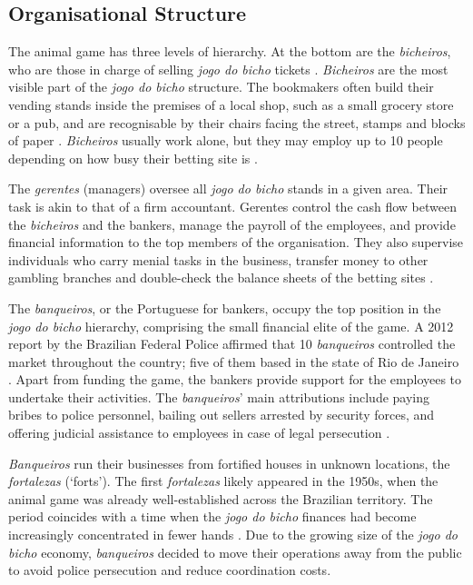\documentclass[a4paper,12pt]{article}
\begin{document}
\subsection{Organisational Structure}
\label{sub:organisation}

The animal game has three levels of hierarchy. At the bottom are the \emph{bicheiros}, who are those in charge of selling \emph{jogo do bicho} tickets \citep{chazkel2007beyond, chazkel2011laws, da1999aguias, labronici2014sorteio, magalhaes2005ganhou, misse2007illegal}. \emph{Bicheiros} are the most visible part of the \emph{jogo do bicho} structure. The bookmakers often build their vending stands inside the premises of a local shop, such as a small grocery store or a pub, and are recognisable by their chairs facing the street, stamps and blocks of paper \citep[259]{chazkel2011laws}. \emph{Bicheiros} usually work alone, but they may employ up to 10 people depending on how busy their betting site is \citep[69]{labronici2014sorteio}.

The \emph{gerentes} (managers) oversee all \emph{jogo do bicho} stands in a given area. Their task is akin to that of a firm accountant. Gerentes control the cash flow between the \emph{bicheiros} and the bankers, manage the payroll of the employees, and provide financial information to the top members of the organisation. They also supervise individuals who carry menial tasks in the business, transfer money to other gambling branches and double-check the balance sheets of the betting sites \citetext{\citealp[71]{labronici2012paratodos}; \citealp[142]{misse2007illegal}}.

The \emph{banqueiros}, or the Portuguese for bankers, occupy the top position in the \emph{jogo do bicho} hierarchy, comprising the small financial elite of the game. A 2012 report by the Brazilian Federal Police affirmed that 10 \emph{banqueiros} controlled the market throughout the country; five of them based in the state of Rio de Janeiro \citep{globo2012contraventores}. Apart from funding the game, the bankers provide support for the employees to undertake their activities. The \emph{banqueiros}' main attributions include paying bribes to police personnel, bailing out sellers arrested by security forces, and offering judicial assistance to employees in case of legal persecution \citep[75]{labronici2012paratodos}.

\emph{Banqueiros} run their businesses from fortified houses in unknown locations, the \emph{fortalezas} (`forts'). The first \emph{fortalezas} likely appeared in the 1950s, when the animal game was already well-established across the Brazilian territory. The period coincides with a time when the \emph{jogo do bicho} finances had become increasingly concentrated in fewer hands \citep[259]{chazkel2011laws}. Due to the growing size of the \emph{jogo do bicho} economy, \emph{banqueiros} decided to move their operations away from the public to avoid police persecution and reduce coordination costs.
\end{document}
